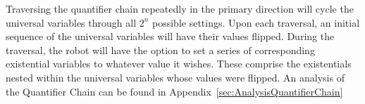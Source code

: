 Traversing the quantifier chain
repeatedly in the primary direction will cycle the universal variables through all $2^n$ possible settings.
Upon each traversal, an initial sequence of the universal variables will have their values flipped.
During the traversal, the robot will have the option to set a series of corresponding existential variables to whatever value it wishes. These comprise the existentials nested within the universal variables whose values were flipped. An analysis of the Quantifier Chain can be found in Appendix~\ref{sec:AnalysisQuantifierChain}
%
%
%
%
%
%

